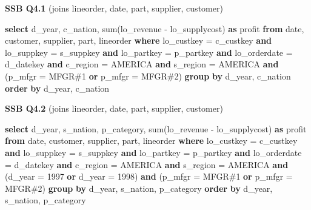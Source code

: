\documentclass[
]{article}
\newenvironment{Shaded}{}{}
\newcommand{\DataTypeTok}[1]{\textcolor[rgb]{0.56,0.13,0.00}{#1}}
\newcommand{\DecValTok}[1]{\textcolor[rgb]{0.25,0.63,0.44}{#1}}
\newcommand{\FunctionTok}[1]{\textcolor[rgb]{0.02,0.16,0.49}{#1}}
\newcommand{\KeywordTok}[1]{\textcolor[rgb]{0.00,0.44,0.13}{\textbf{#1}}}
\newcommand{\NormalTok}[1]{#1}
\newcommand{\OperatorTok}[1]{\textcolor[rgb]{0.40,0.40,0.40}{#1}}
\newcommand{\StringTok}[1]{\textcolor[rgb]{0.25,0.44,0.63}{#1}}
\begin{document}
\textbf{SSB Q4.1} (joins lineorder, date, part, supplier, customer)

\begin{Shaded}
\begin{Highlighting}[]
\KeywordTok{select}\NormalTok{ d\_year, c\_nation, }\FunctionTok{sum}\NormalTok{(lo\_revenue }\OperatorTok{{-}}\NormalTok{ lo\_supplycost) }\KeywordTok{as}\NormalTok{ profit}
\KeywordTok{from} \DataTypeTok{date}\NormalTok{, customer, supplier, part, lineorder}
\KeywordTok{where}\NormalTok{ lo\_custkey }\OperatorTok{=}\NormalTok{ c\_custkey }\KeywordTok{and}\NormalTok{ lo\_suppkey }\OperatorTok{=}\NormalTok{ s\_suppkey }\KeywordTok{and}\NormalTok{ lo\_partkey }\OperatorTok{=}\NormalTok{ p\_partkey }\KeywordTok{and}\NormalTok{ lo\_orderdate }\OperatorTok{=}\NormalTok{ d\_datekey }\KeywordTok{and}\NormalTok{ c\_region }\OperatorTok{=} \StringTok{\textquotesingle{}AMERICA\textquotesingle{}} \KeywordTok{and}\NormalTok{ s\_region }\OperatorTok{=} \StringTok{\textquotesingle{}AMERICA\textquotesingle{}} \KeywordTok{and}\NormalTok{ (p\_mfgr }\OperatorTok{=} \StringTok{\textquotesingle{}MFGR\#1\textquotesingle{}} \KeywordTok{or}\NormalTok{ p\_mfgr }\OperatorTok{=} \StringTok{\textquotesingle{}MFGR\#2\textquotesingle{}}\NormalTok{)}
\KeywordTok{group} \KeywordTok{by}\NormalTok{ d\_year, c\_nation}
\KeywordTok{order} \KeywordTok{by}\NormalTok{ d\_year, c\_nation}
\end{Highlighting}
\end{Shaded}

\textbf{SSB Q4.2} (joins lineorder, date, part, supplier, customer)

\begin{Shaded}
\begin{Highlighting}[]
\KeywordTok{select}\NormalTok{ d\_year, s\_nation, p\_category, }\FunctionTok{sum}\NormalTok{(lo\_revenue }\OperatorTok{{-}}\NormalTok{ lo\_supplycost) }\KeywordTok{as}\NormalTok{ profit}
\KeywordTok{from} \DataTypeTok{date}\NormalTok{, customer, supplier, part, lineorder}
\KeywordTok{where}\NormalTok{ lo\_custkey }\OperatorTok{=}\NormalTok{ c\_custkey }\KeywordTok{and}\NormalTok{ lo\_suppkey }\OperatorTok{=}\NormalTok{ s\_suppkey }\KeywordTok{and}\NormalTok{ lo\_partkey }\OperatorTok{=}\NormalTok{ p\_partkey }\KeywordTok{and}\NormalTok{ lo\_orderdate }\OperatorTok{=}\NormalTok{ d\_datekey }\KeywordTok{and}\NormalTok{ c\_region }\OperatorTok{=} \StringTok{\textquotesingle{}AMERICA\textquotesingle{}} \KeywordTok{and}\NormalTok{ s\_region }\OperatorTok{=} \StringTok{\textquotesingle{}AMERICA\textquotesingle{}} \KeywordTok{and}\NormalTok{ (d\_year }\OperatorTok{=} \DecValTok{1997} \KeywordTok{or}\NormalTok{ d\_year }\OperatorTok{=} \DecValTok{1998}\NormalTok{) }\KeywordTok{and}\NormalTok{ (p\_mfgr }\OperatorTok{=} \StringTok{\textquotesingle{}MFGR\#1\textquotesingle{}} \KeywordTok{or}\NormalTok{ p\_mfgr }\OperatorTok{=} \StringTok{\textquotesingle{}MFGR\#2\textquotesingle{}}\NormalTok{)}
\KeywordTok{group} \KeywordTok{by}\NormalTok{ d\_year, s\_nation, p\_category}
\KeywordTok{order} \KeywordTok{by}\NormalTok{ d\_year, s\_nation, p\_category}
\end{Highlighting}
\end{Shaded}
\end{document}
